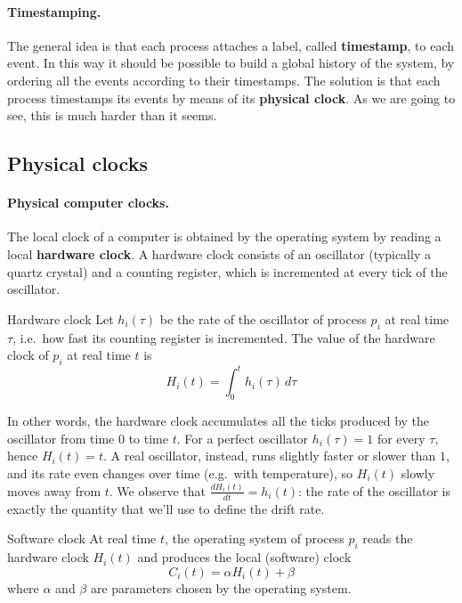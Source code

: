 \paragraph{Timestamping.} The general idea is that each process attaches a label, called \textbf{timestamp}, to each event. In this way it should be possible to build a global history of the system, by ordering all the events according to their timestamps. The  solution is that each process timestamps its events by means of its \textbf{physical clock}. As we are going to see, this is much harder than it seems.

\subsection{Physical clocks}

\paragraph{Physical computer clocks.} The local clock of a computer is obtained by the operating system by reading a local \textbf{hardware clock}. A hardware clock consists of an oscillator (typically a quartz crystal) and a counting register, which is incremented at every tick of the oscillator.

\begin{frameddefn}{Hardware clock}
  Let $h_i(\tau)$ be the rate of the oscillator of process $p_i$ at real time $\tau$, i.e.\ how fast its counting register is incremented. The value of the hardware clock of $p_i$ at real time $t$ is
  \[H_i(t) = \int_0^t h_i(\tau)\, d\tau\]
\end{frameddefn}

In other words, the hardware clock accumulates all the ticks produced by the oscillator from time $0$ to time $t$. For a perfect oscillator $h_i(\tau) = 1$ for every $\tau$, hence $H_i(t) = t$. A real oscillator, instead, runs slightly faster or slower than $1$, and its rate even changes over time (e.g.\ with temperature), so $H_i(t)$ slowly moves away from $t$. We observe that $\frac{dH_i(t)}{dt} = h_i(t)$: the rate of the oscillator is exactly the quantity that we'll use to define the drift rate.

\begin{frameddefn}{Software clock}
  At real time $t$, the operating system of process $p_i$ reads the hardware clock $H_i(t)$ and produces the local (software) clock
  \[C_i(t) = \alpha H_i(t) + \beta\]
  where $\alpha$ and $\beta$ are parameters chosen by the operating system.
\end{frameddefn}

